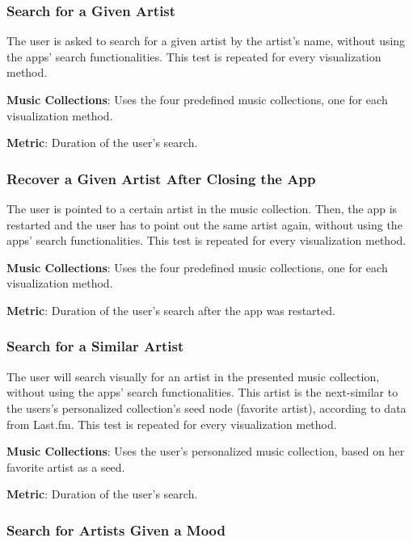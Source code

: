 	
\subsubsection{Search for a Given Artist}
	
The user is asked to search for a given artist by the artist's name, without using the apps' search functionalities. This test is repeated for every visualization method.

\textbf{Music Collections}: Uses the four predefined music collections, one for each visualization method. 

\textbf{Metric}: Duration of the user's search.
	
	
\subsubsection{Recover a Given Artist After Closing the App}
	
The user is pointed to a certain artist in the music collection. Then, the app is restarted and the user has to point out the same artist again, without using the apps' search functionalities. This test is repeated for every visualization method.

\textbf{Music Collections}: Uses the four predefined music collections, one for each visualization method. 

\textbf{Metric}: Duration of the user's search after the app was restarted.
	
	
\subsubsection{Search for a Similar Artist}

The user will search visually for an artist in the presented music collection, without using the apps' search functionalities. This artist is the next-similar to the users's personalized collection's seed node (favorite artist), according to data from Last.fm. This test is repeated for every visualization method.

\textbf{Music Collections}: Uses the user's personalized music collection, based on her favorite artist as a seed.

\textbf{Metric}: Duration of the user's search.

	
\subsubsection{Search for Artists Given a Mood}
	
